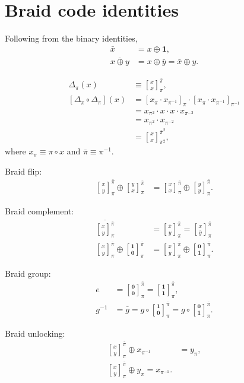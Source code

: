 \documentclass[twocolumn, aps, amsmath, amssymb, nofootinbib, superscriptaddress, longbibliography, doublefloatfix, table-of-contents, eqsecnum, rmp]{revtex4-2}
\def\zerovec{\mathbf{0}}
\def\onevec{\mathbf{1}}
\newcommand{\stackbraid}[2]{{\genfrac{[}{]}{0pt}{}{{#1}}{{#2}}}^{\bar{\pi}}_{\pi}}
\newcommand{\stackbraidpow}[3]{{\genfrac{[}{]}{0pt}{}{{#1}}{{#2}}}^{\bar{\pi}^{#3}}_{\pi^#3}}
\begin{document}
\section{Braid code identities}

Following from the binary identities,
\begin{align}
	\bar{x} &= x \oplus \onevec,\nonumber\\
	\overline{x\oplus y} &= x \oplus \bar{y} = \bar{x} \oplus y.
\end{align}

\begin{align}
	\Delta_\pi(x) &\equiv \stackbraid{x}{x},\nonumber\\
	[\Delta_\pi \circ\Delta_\pi](x) &= [x_\pi \cdot x_{\pi^{-1}}]_\pi \cdot [x_\pi \cdot x_{\pi^{-1}}]_{\pi^{-1}} \nonumber\\
	&= x_{\pi^{2}} \cdot x \cdot x \cdot x_{\pi^{-2}} \nonumber\\
	&= x_{\pi^{2}} \cdot x_{\pi^{-2}} \nonumber\\
	&= \stackbraidpow{x}{x}{2},
\end{align}
where $x_\pi \equiv \pi \circ x$ and $\bar{\pi}\equiv \pi^{-1}$.

Braid flip:
\begin{align}
	\stackbraid{x}{y} \oplus \stackbraid{y}{x} &= \stackbraid{x}{x} \oplus \stackbraid{y}{y}.
\end{align}

Braid complement:
\begin{align}
	\overline{\stackbraid{x}{y}} &= \stackbraid{\bar{x}}{y} = \stackbraid{x}{\bar{y}} \nonumber\\
\stackbraid{x}{y} \oplus \stackbraid{\onevec}{\zerovec} &= \stackbraid{x}{y} \oplus \stackbraid{\zerovec}{\onevec}.
\end{align}

Braid group:
\begin{align}
	e &= \stackbraid{\zerovec}{\zerovec} = \stackbraid{\onevec}{\onevec},\nonumber\\
	g^{-1} &= \bar{g} = g\circ \stackbraid{\onevec}{\zerovec} = g\circ \stackbraid{\zerovec}{\onevec}.
\end{align}

Braid unlocking:
\begin{align}
	\stackbraid{x}{y} \oplus x_{\pi^{-1}} &= y_\pi,\nonumber\\
	\stackbraid{x}{y} \oplus y_{\pi} = x_{\pi^{-1}}.
\end{align}
\end{document}
